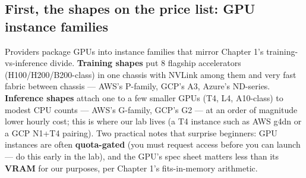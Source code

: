 \subsection*{First, the shapes on the price list: GPU instance families}

Providers package GPUs into instance families that mirror Chapter 1's training-vs-inference divide. \textbf{Training shapes} put 8 flagship accelerators (H100/H200/B200-class) in one chassis with NVLink among them and very fast fabric between chassis — AWS's P-family, GCP's A3, Azure's ND-series. \textbf{Inference shapes} attach one to a few smaller GPUs (T4, L4, A10-class) to modest CPU counts — AWS's G-family, GCP's G2 — at an order of magnitude lower hourly cost; this is where our lab lives (a T4 instance such as AWS g4dn or a GCP N1+T4 pairing). Two practical notes that surprise beginners: GPU instances are often \textbf{quota-gated} (you must request access before you can launch — do this early in the lab), and the GPU's spec sheet matters less than its \textbf{VRAM} for our purposes, per Chapter 1's fits-in-memory arithmetic.

